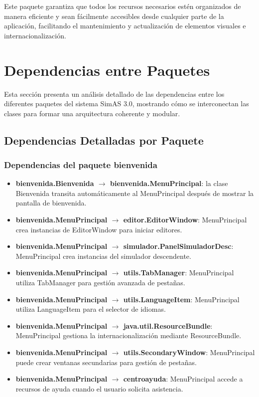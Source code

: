 Este paquete garantiza que todos los recursos necesarios estén organizados de manera eficiente y sean fácilmente accesibles desde cualquier parte de la aplicación, facilitando el mantenimiento y actualización de elementos visuales e internacionalización.

\section{Dependencias entre Paquetes}

Esta sección presenta un análisis detallado de las dependencias entre los diferentes paquetes del sistema SimAS 3.0, mostrando cómo se interconectan las clases para formar una arquitectura coherente y modular.

\subsection{Dependencias Detalladas por Paquete}

\subsubsection{Dependencias del paquete bienvenida}

\begin{itemize}
    \item \textbf{bienvenida.Bienvenida $\rightarrow$ bienvenida.MenuPrincipal}: la clase Bienvenida transita automáticamente al MenuPrincipal después de mostrar la pantalla de bienvenida.
    \item \textbf{bienvenida.MenuPrincipal $\rightarrow$ editor.EditorWindow}: MenuPrincipal crea instancias de EditorWindow para iniciar editores.
    \item \textbf{bienvenida.MenuPrincipal $\rightarrow$ simulador.PanelSimuladorDesc}: MenuPrincipal crea instancias del simulador descendente.
    \item \textbf{bienvenida.MenuPrincipal $\rightarrow$ utils.TabManager}: MenuPrincipal utiliza TabManager para gestión avanzada de pestañas.
    \item \textbf{bienvenida.MenuPrincipal $\rightarrow$ utils.LanguageItem}: MenuPrincipal utiliza LanguageItem para el selector de idiomas.
    \item \textbf{bienvenida.MenuPrincipal $\rightarrow$ java.util.ResourceBundle}: MenuPrincipal gestiona la internacionalización mediante ResourceBundle.
    \item \textbf{bienvenida.MenuPrincipal $\rightarrow$ utils.SecondaryWindow}: MenuPrincipal puede crear ventanas secundarias para gestión de pestañas.
    \item \textbf{bienvenida.MenuPrincipal $\rightarrow$ centroayuda}: MenuPrincipal accede a recursos de ayuda cuando el usuario solicita asistencia.
\end{itemize}

